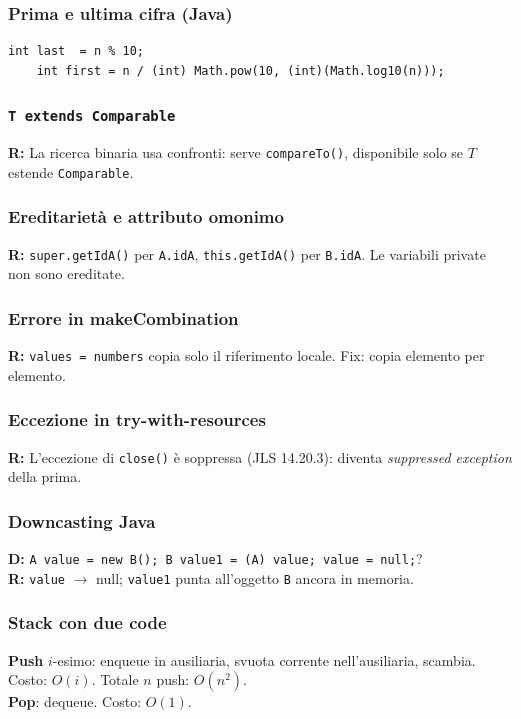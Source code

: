 \subsubsection*{Prima e ultima cifra (Java)}
\begin{lstlisting}[basicstyle=\ttfamily\footnotesize]
	int last  = n % 10;
	int first = n / (int) Math.pow(10, (int)(Math.log10(n)));
\end{lstlisting}

\subsubsection*{\texorpdfstring{\texttt{T extends Comparable}}%
	{T extends Comparable}}
\textbf{R:} La ricerca binaria usa confronti: serve \texttt{compareTo()},
disponibile solo se $T$ estende \texttt{Comparable}.

\subsubsection*{Ereditarietà e attributo omonimo}
\textbf{R:} \texttt{super.getIdA()} per \texttt{A.idA},
\texttt{this.getIdA()} per \texttt{B.idA}.
Le variabili private non sono ereditate.

\subsubsection*{Errore in makeCombination}
\textbf{R:} \texttt{values = numbers} copia solo il riferimento locale.
Fix: copia elemento per elemento.

\subsubsection*{Eccezione in try-with-resources}
\textbf{R:} L'eccezione di \texttt{close()} è soppressa (JLS 14.20.3):
diventa \textit{suppressed exception} della prima.

\subsubsection*{Downcasting Java}
\textbf{D:} \texttt{A value = new B(); B value1 = (A) value; value = null;}?\\
\textbf{R:} \texttt{value} $\to$ null; \texttt{value1} punta all'oggetto
\texttt{B} ancora in memoria.

\subsubsection*{Stack con due code}
\noindent\textbf{Push} $i$-esimo: enqueue in ausiliaria, svuota corrente
nell'ausiliaria, scambia. Costo: $O(i)$. Totale $n$ push: $O(n^2)$.\\
\noindent\textbf{Pop}: dequeue. Costo: $O(1)$.

